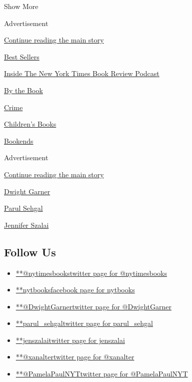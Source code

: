 Show More

Advertisement

\protect\hyperlink{after-mid2}{Continue reading the main story}

\href{https://www.nytimes3xbfgragh.onion/best-sellers-books/overview.html}{Best
Sellers}

\href{https://www.nytimes3xbfgragh.onion/column/book-review-podcast}{Inside
The New York Times Book Review Podcast}

\href{https://www.nytimes3xbfgragh.onion/column/by-the-book}{By the
Book}

\href{https://www.nytimes3xbfgragh.onion/column/crime}{Crime}

\href{https://www.nytimes3xbfgragh.onion/column/childrens-books}{Children's
Books}

\href{https://www.nytimes3xbfgragh.onion/column/bookends}{Bookends}

Advertisement

\protect\hyperlink{after-mktg}{Continue reading the main story}

\href{https://www.nytimes3xbfgragh.onion/by/dwight-garner}{Dwight
Garner}

\href{https://www.nytimes3xbfgragh.onion/by/parul-sehgal}{Parul Sehgal}

\href{https://www.nytimes3xbfgragh.onion/by/jennifer-szalai}{Jennifer
Szalai}

\hypertarget{follow-us}{%
\subsection{Follow Us}\label{follow-us}}

\begin{itemize}
\tightlist
\item
  \href{https://twitter.com/nytimesbooks}{**@nytimesbookstwitter page
  for @nytimesbooks}
\item
  \href{https://www.facebookcorewwwi.onion/nytbooks}{**nytbooksfacebook
  page for nytbooks}
\item
  \href{https://twitter.com/DwightGarner}{**@DwightGarnertwitter page
  for @DwightGarner}
\item
  \href{https://twitter.com/parul_sehgal}{**parul\_sehgaltwitter page
  for parul\_sehgal}
\item
  \href{https://twitter.com/jenszalai}{**jenszalaitwitter page for
  jenszalai}
\item
  \href{https://twitter.com/xanalter}{**@xanaltertwitter page for
  @xanalter}
\item
  \href{https://twitter.com/PamelaPaulNYT}{**@PamelaPaulNYTtwitter page
  for @PamelaPaulNYT}
\end{itemize}


